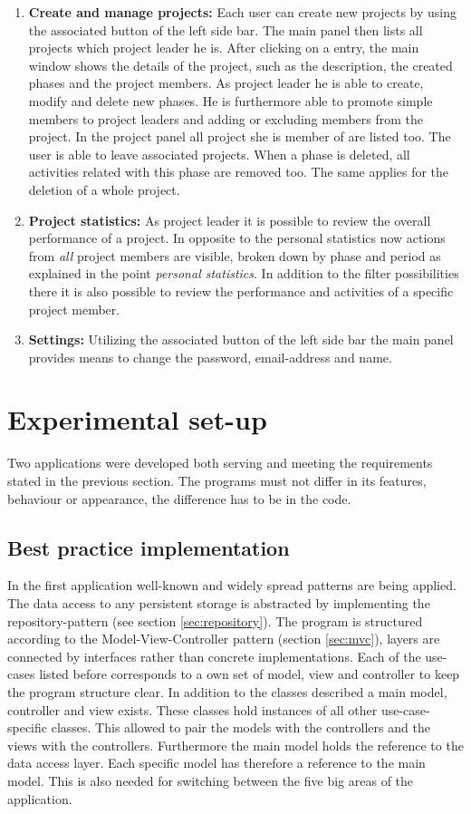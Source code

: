 \begin{enumerate}
\item \textbf{Create and manage projects:} Each user can create new projects by using the associated button of the left side bar. The main panel then lists all projects which project leader he is. After clicking on a entry, the main window shows the details of the project, such as the description, the created phases and the project members. As project leader he is able to create, modify and delete new phases. He is furthermore able to promote simple members to project leaders and adding or excluding members from the project. In the project panel all project she is member of are listed too. The user is able to leave associated projects. When a phase is deleted, all activities related with this phase are removed too. The same applies for the deletion of a whole project. 

\item \textbf{Project statistics:} As project leader it is possible to review the overall performance of a project. In opposite to the personal statistics now actions from \emph{all} project members are visible, broken down by phase and period as explained in the point \emph{personal statistics}. In addition to the filter possibilities there it is also possible to review the performance and activities of a specific project member.

\item \textbf{Settings:} Utilizing the associated button of the left side bar the main panel provides means to change the password, email-address and name.
\end{enumerate}


\section{Experimental set-up}
Two applications were developed both serving and meeting the requirements stated in the previous section. The programs must not differ in its features, behaviour or appearance, the difference has to be in the code. 
\subsection{Best practice implementation}
In the first application well-known and widely spread patterns are being applied. The data access to any persistent storage is abstracted by implementing the repository-pattern (see section \ref{sec:repository}). The program is structured according to the Model-View-Controller pattern (section \ref{sec:mvc}), layers are connected by interfaces rather than concrete implementations. Each of the use-cases listed before corresponds to a own set of model, view and controller to keep the program structure clear. In addition to the classes described a main model, controller and view exists. These classes hold instances of all other use-case-specific classes. This allowed to pair the models with the controllers and the views with the controllers. Furthermore the main model holds the reference to the data access layer. Each specific model has therefore a reference to the main model. This is also needed for switching between the five big areas of the application.

